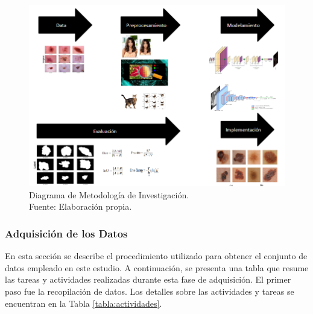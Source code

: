 \begin{figure}[h]
	\begin{center}
		\includegraphics[width=1\textwidth]{3/figures/metodologia.png}
		\caption[Diagrama de Metodología de Investigación]{Diagrama de Metodología de Investigación.\\
			Fuente: Elaboración propia.}
		\label{3:fig3}
	\end{center}
\end{figure}


\subsubsection{Adquisición de los Datos}

En esta sección se describe el procedimiento utilizado para obtener el conjunto de datos empleado en este estudio. A continuación, se presenta una tabla que resume las tareas y actividades realizadas durante esta fase de adquisición. El primer paso fue la recopilación de datos. Los detalles sobre las actividades y tareas se encuentran en la Tabla \ref{tabla:actividades}.

